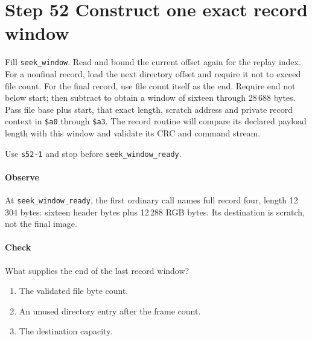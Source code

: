 \section{Step 52 Construct one exact record window}
Fill \texttt{seek\_window}. Read and bound the current offset again for the replay index. For a nonfinal record, load the next directory offset and require it not to exceed file count. For the final record, use file count itself as the end. Require end not below start; then subtract to obtain a window of sixteen through 28\,688 bytes. Pass file base plus start, that exact length, scratch address and private record context in \texttt{\$a0} through \texttt{\$a3}. The record routine will compare its declared payload length with this window and validate its CRC and command stream.

Use \texttt{s52-1} and stop before \texttt{seek\_window\_ready}.

\paragraph{Observe} At \texttt{seek\_window\_ready}, the first ordinary call names full record four, length 12\,304 bytes: sixteen header bytes plus 12\,288 RGB bytes. Its destination is scratch, not the final image.

\paragraph{Check} What supplies the end of the last record window?
\begin{enumerate}[label=\Alph*.]
  \item The validated file byte count.
  \item An unused directory entry after the frame count.
  \item The destination capacity.
\end{enumerate}
